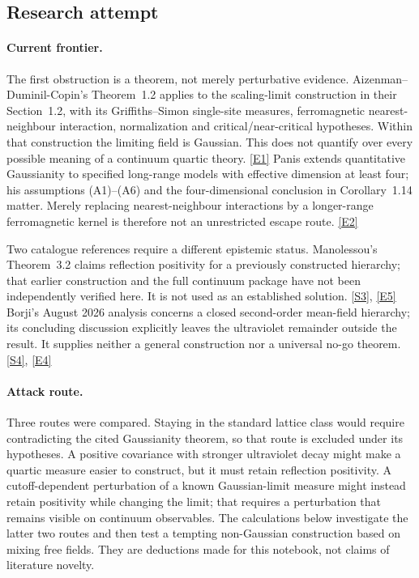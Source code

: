 \documentclass[11pt]{article}
\newcommand{\sref}[2]{\hyperlink{source:#1:#2}{[S#2]}}
\newcommand{\eref}[2]{\hyperlink{extra:#1:#2}{[E#2]}}
\begin{document}
\subsection{Research attempt}

\paragraph{Current frontier.}
The first obstruction is a theorem, not merely perturbative evidence.
Aizenman--Duminil-Copin's Theorem~1.2 applies to the scaling-limit
construction in their Section~1.2, with its Griffiths--Simon single-site
measures, ferromagnetic nearest-neighbour interaction, normalization and
critical/near-critical hypotheses. Within that construction the limiting
field is Gaussian. This does not quantify over every possible meaning of a
continuum quartic theory. \eref{51}{1}
Panis extends quantitative Gaussianity to specified long-range models with
effective dimension at least four; his assumptions (A1)--(A6) and the
four-dimensional conclusion in Corollary~1.14 matter. Merely replacing
nearest-neighbour interactions by a longer-range ferromagnetic kernel is
therefore not an unrestricted escape route. \eref{51}{2}

Two catalogue references require a different epistemic status. Manolessou's
Theorem~3.2 claims reflection positivity for a previously constructed
hierarchy; that earlier construction and the full continuum package have
not been independently verified here. It is not used as an established
solution. \sref{51}{3}, \eref{51}{5}
Borji's August 2026 analysis concerns a closed second-order mean-field
hierarchy; its concluding discussion explicitly leaves the ultraviolet
remainder outside the result. It supplies neither a general construction
nor a universal no-go theorem. \sref{51}{4}, \eref{51}{4}

\paragraph{Attack route.}
Three routes were compared. Staying in the standard lattice class would
require contradicting the cited Gaussianity theorem, so that route is
excluded under its hypotheses. A positive covariance with stronger
ultraviolet decay might make a quartic measure easier to construct, but it
must retain reflection positivity. A cutoff-dependent perturbation of a
known Gaussian-limit measure might instead retain positivity while changing
the limit; that requires a perturbation that remains visible on continuum
observables. The calculations below investigate the latter two routes and
then test a tempting non-Gaussian construction based on mixing free fields.
They are deductions made for this notebook, not claims of literature novelty.
\end{document}
